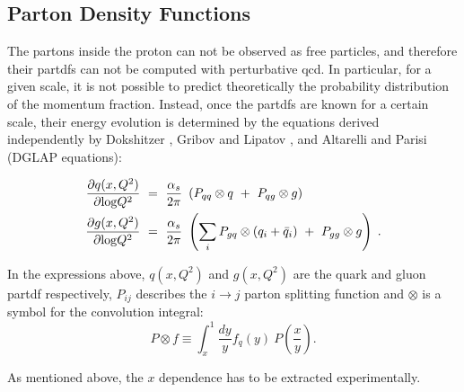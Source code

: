 


\subsection{Parton Density Functions}

The partons inside the proton can not be observed as free particles, and therefore their \glspl{partdf} can not be computed with
perturbative \gls{qcd}. In particular, for a given scale, it is not possible to predict theoretically the probability distribution 
of the momentum fraction. Instead, once the \glspl{partdf} are known for a certain scale, their energy evolution is 
determined by the equations derived independently by Dokshitzer \cite{Dokshitzer:1977sg} , Gribov and Lipatov \cite{Gribov:1972ri}, and Altarelli and Parisi \cite{ALTARELLI1977298} (DGLAP equations):

\begin{equation}
\begin{aligned}
\frac{\partial q(x,Q^2)}{\partial {\rm log}Q^2}~&=~\frac{\alpha_s}{2\pi}~\left( P_{qq} \otimes q~+~P_{qg} \otimes g \right) \, \\
\frac{\partial g(x,Q^2)}{\partial {\rm log}Q^2}~&=~\frac{\alpha_s}{2\pi}~\left( \sum_i P_{gq} \otimes (q_i+\bar{q}_i)~+~P_{gg} \otimes g \right) \; .
\label{eq:glap1}
\end{aligned}
\end{equation}

\noindent In the expressions above, $q(x,Q^2)$ and $g(x,Q^2)$ are the quark and gluon \gls{partdf} respectively, 
$P_{ij}$ describes the $i \to j$ parton splitting function
and $\otimes$ is a symbol for the convolution integral:
\begin{equation}
P \otimes f \equiv \int^1_x\frac{dy}{y}f_q(y)~P\left(\frac{x}{y}\right).
\end{equation}

As mentioned above, the $x$ dependence has to be extracted experimentally. 

